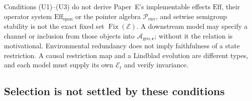 \begin{remark}
\label{rem:translation}
Conditions (U1)--(U3) do not derive Paper~E's implementable effects $\mathrm{Eff}$, their operator system $\mathrm{Eff}_{\mathrm{span}}$ or the pointer algebra $\mathcal P_{\mathrm{env}}$, and setwise semigroup stability is not the exact fixed set $\operatorname{Fix}(\mathcal E)$. A downstream model may specify a channel or inclusion from those objects into $\mathcal{A}_{\mathrm{geo},\mathbf{c}}$; without it the relation is motivational. Environmental redundancy does not imply faithfulness of a state restriction. A causal restriction map and a Lindblad evolution are different types, and each model must supply its own $\mathcal E_t$ and verify invariance.
\end{remark}

\subsection{Selection is not settled by these conditions}
\label{sec:modular-uniqueness}

